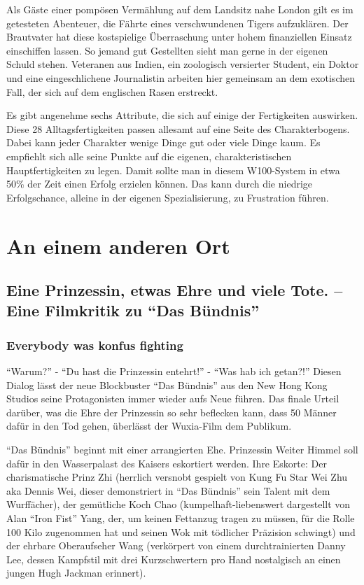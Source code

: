 \documentclass[final]{multiversum}
\begin{document}
Als Gäste einer pompösen Vermählung auf dem Landsitz nahe London gilt es im getesteten Abenteuer, die Fährte eines verschwundenen Tigers aufzuklären.
Der Brautvater hat diese kostspielige Überraschung unter hohem finanziellen Einsatz einschiffen lassen.
So jemand gut Gestellten sieht man gerne in der eigenen Schuld stehen.
Veteranen aus Indien, ein zoologisch versierter Student, ein Doktor und eine eingeschlichene Journalistin arbeiten hier gemeinsam an dem exotischen Fall, 
der sich auf dem englischen Rasen erstreckt.

Es gibt angenehme sechs Attribute, die sich auf einige der Fertigkeiten auswirken.
Diese 28 Alltagsfertigkeiten passen allesamt auf eine Seite des Charakterbogens.
Dabei kann jeder Charakter wenige Dinge gut oder viele Dinge kaum.
Es empfiehlt sich alle seine Punkte auf die eigenen, charakteristischen Hauptfertigkeiten zu legen.
Damit sollte man in diesem W100-System in etwa 50\% der Zeit einen Erfolg erzielen können.
Das kann durch die niedrige Erfolgschance, alleine in der eigenen Spezialisierung, zu Frustration führen.

\section{An einem anderen Ort}

\subsection{Eine Prinzessin, etwas Ehre und viele Tote. -- Eine Filmkritik zu \enquote{Das Bündnis}}
\subsubsection{Everybody was konfus fighting}

\enquote{Warum?} - \enquote{Du hast die Prinzessin entehrt!} - \enquote{Was hab ich getan?!}
Diesen Dialog lässt der neue Blockbuster \enquote{Das Bündnis} aus den New Hong Kong Studios seine Protagonisten immer
wieder aufs Neue führen. Das finale Urteil darüber, was die Ehre der Prinzessin so sehr beflecken kann, dass 50 Männer
dafür in den Tod gehen, überlässt der Wuxia-Film dem Publikum.

\enquote{Das Bündnis} beginnt mit einer arrangierten Ehe. Prinzessin Weiter Himmel soll dafür in den Wasserpalast
des Kaisers eskortiert werden. Ihre Eskorte:
Der charismatische Prinz Zhi
(herrlich versnobt gespielt von Kung Fu Star Wei Zhu aka Dennis Wei, dieser demonstriert in \enquote{Das Bündnis} sein
Talent mit dem Wurffächer),
der gemütliche Koch Chao (kumpelhaft-liebenswert dargestellt von Alan \enquote{Iron Fist} Yang,
der, um keinen Fettanzug tragen zu müssen, für die Rolle 100 Kilo zugenommen hat und seinen Wok mit tödlicher Präzision
schwingt)
und der ehrbare Oberaufseher Wang (verkörpert von einem durchtrainierten Danny Lee, dessen Kampfstil mit drei
Kurzschwertern pro Hand nostalgisch an einen jungen Hugh Jackman erinnert).
\end{document}
